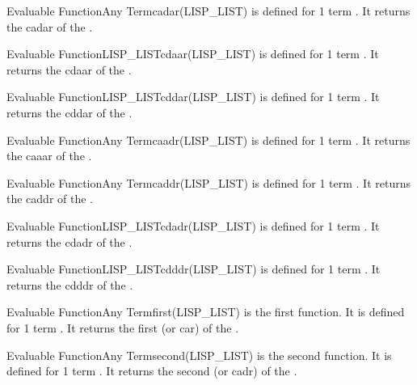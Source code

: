 \begin{typeefa}{Evaluable Function}{Any Term}{cadar}{(LISP\_LIST)}
is defined for 1 term . It returns the cadar  of the
.
\end{typeefa}

\begin{typeefa}{Evaluable Function}{LISP\_LIST}{cdaar}{(LISP\_LIST)}
is defined for 1 term . It returns the cdaar   of the
.
\end{typeefa}

\begin{typeefa}{Evaluable Function}{LISP\_LIST}{cddar}{(LISP\_LIST)}
is defined for 1 term . It returns the cddar  of the
.
\end{typeefa}

\begin{typeefa}{Evaluable Function}{Any Term}{caadr}{(LISP\_LIST)}
is defined for 1 term . It returns the caaar  of the
.
\end{typeefa}

\begin{typeefa}{Evaluable Function}{Any Term}{caddr}{(LISP\_LIST)}
is defined for 1 term . It returns the caddr  of the
.
\end{typeefa}

\begin{typeefa}{Evaluable Function}{LISP\_LIST}{cdadr}{(LISP\_LIST)}
is defined for 1 term . It returns the cdadr  of the
.
\end{typeefa}

\begin{typeefa}{Evaluable Function}{LISP\_LIST}{cdddr}{(LISP\_LIST)}
is defined for 1 term . It returns the cdddr
 of the .
\end{typeefa}

\begin{typeefa}{Evaluable Function}{Any Term}{first}{(LISP\_LIST)}
is the first function. It is defined for 1 term . It returns the
first (or car)  of the .
\end{typeefa}

\begin{typeefa}{Evaluable Function}{Any Term}{second}{(LISP\_LIST)}
is the second function. It is defined for 1 term . It returns
the second (or cadr)  of the .
\end{typeefa}

